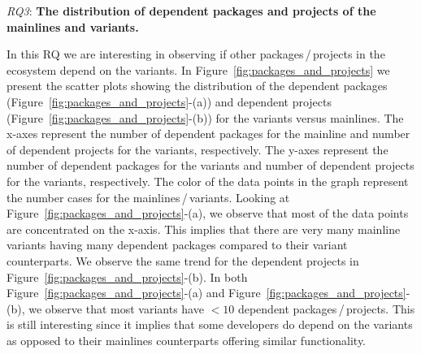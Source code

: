 \textit{RQ3}: \textbf{The distribution of dependent packages and projects of the mainlines and variants.}

In this RQ we are interesting in observing if other packages\,/\,projects in the ecosystem depend on the variants.
In Figure~\ref{fig:packages_and_projects} we present the scatter plots showing the distribution of the dependent packages (Figure~\ref{fig:packages_and_projects}-(a)) and dependent projects (Figure~\ref{fig:packages_and_projects}-(b)) for the variants versus mainlines.
The x-axes represent the number of dependent packages for the mainline and number of dependent projects for the variants, respectively.
The y-axes represent the number of dependent packages for the variants and number of dependent projects for the variants, respectively.
The color of the data points in the graph represent the number cases for the mainlines\,/\,variants.
Looking at Figure~\ref{fig:packages_and_projects}-(a), we observe that most of the data points are concentrated on the x-axis. 
This implies that there are very many mainline variants having many dependent packages compared to their variant counterparts.
We observe the same trend for the dependent projects in Figure~\ref{fig:packages_and_projects}-(b).
In both Figure~\ref{fig:packages_and_projects}-(a) and Figure~\ref{fig:packages_and_projects}-(b), we observe that most variants have $<10$ dependent packages\,/\,projects. 
This is still interesting since it implies that some developers do depend on the variants as opposed to their mainlines counterparts offering similar functionality.
